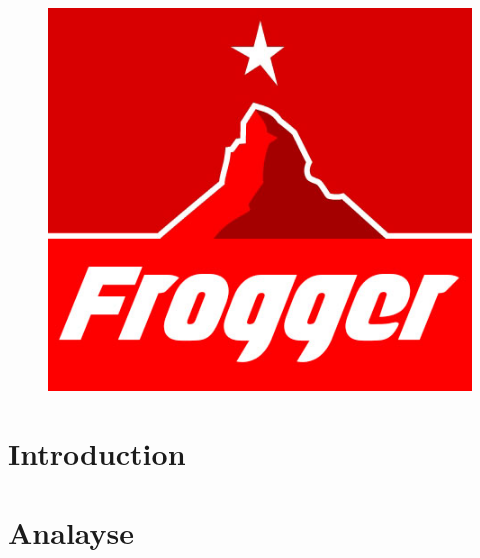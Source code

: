 \documentclass[a4paper,11pt]{article}
\author{\auteur}
\title{\titre}
\date{\today}
\begin{document}
\clearpage\maketitle
\thispagestyle{empty}

	\maketitle
	\begin{figure}[h!]
		\centering
		\includegraphics[scale=0.7]{../Logo/logo.jpg}
	\end{figure}
	\newpage


	\tableofcontents
	\listoffigures


	\newpage
	
	\section{Introduction}
	
	
	\section{Analayse}
	
\end{document}
